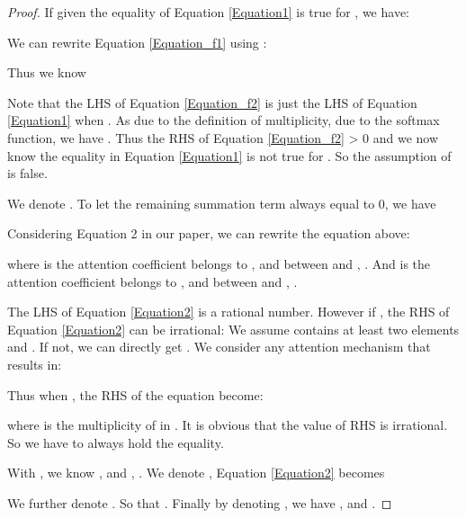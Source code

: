 \documentclass[letterpaper]{article} \usepackage{aaai20}  \usepackage{times}  \usepackage{helvet} \usepackage{courier}  \usepackage[hyphens]{url}  \usepackage{graphicx} \urlstyle{rm} \def\UrlFont{\rm}  \usepackage{graphicx}  \frenchspacing  \setlength{\pdfpagewidth}{8.5in}  \setlength{\pdfpageheight}{11in}
\theoremstyle{plain}
\theoremstyle{definition}
\begin{document}
\begin{proof}
If given the equality of Equation \ref{Equation1} is true for , we have:


We can rewrite Equation \ref{Equation_f1} using :


Thus we know


Note that the LHS of Equation \ref{Equation_f2} is just the LHS of Equation \ref{Equation1} when . As  due to the definition of multiplicity,  due to the softmax function, we have . Thus the RHS of Equation \ref{Equation_f2} > 0 and we now know the equality in Equation \ref{Equation1} is not true for . So the assumption of  is false. 

We denote . To let the remaining summation term always equal to 0, we have 


Considering Equation 2 in our paper, we can rewrite the equation above: 

where  is the attention coefficient belongs to , and between  and , . And  is the attention coefficient belongs to , and between  and , .

The LHS of Equation \ref{Equation2} is a rational number. However if , the RHS of Equation \ref{Equation2} can be irrational: We assume  contains at least two elements  and . If not, we can directly get . We consider any attention mechanism that results in: 


Thus when , the RHS of the equation become:

where  is the multiplicity of  in . It is obvious that the value of RHS is irrational. So we have  to always hold the equality.

With , we know ,  and , . We denote , Equation \ref{Equation2} becomes


We further denote . So that . Finally by denoting , we have ,  and .
\end{proof}
\end{document}
